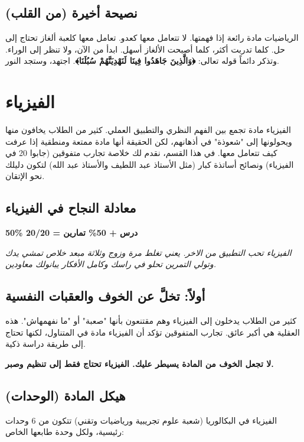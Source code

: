 \documentclass[12pt,a4paper]{book}
\newcommand{\quoteAr}[1]{%
	\begin{myquote}
		\itshape #1
	\end{myquote}
}
\newcommand{\importantAr}[1]{%
	\begin{important}
		\bfseries #1
	\end{important}
}
\begin{document}
	\subsection{نصيحة أخيرة (من القلب)}
	الرياضيات مادة رائعة إذا فهمتها. لا تتعامل معها كعدو. تعامل معها كلعبة ألغاز تحتاج إلى حل. كلما تدربت أكثر، كلما أصبحت الألغاز أسهل. ابدأ من الآن، ولا تنظر إلى الوراء. وتذكر دائماً قوله تعالى: \textbf{﴿وَالَّذِينَ جَاهَدُوا فِينَا لَنَهْدِيَنَّهُمْ سُبُلَنَا﴾}. اجتهد، وستجد النور.
	
	
	\section{الفيزياء}
	
	الفيزياء مادة تجمع بين الفهم النظري والتطبيق العملي. كثير من الطلاب يخافون منها ويحولونها إلى "شعوذة" في أذهانهم، لكن الحقيقة أنها مادة ممتعة ومنطقية إذا عرفت كيف تتعامل معها. في هذا القسم، نقدم لك خلاصة تجارب متفوقين (جابوا 20 في الفيزياء) ونصائح أساتذة كبار (مثل الأستاذ عبد اللطيف والأستاذ عبد الله) لتكون دليلك نحو الإتقان.
	
	\subsection{معادلة النجاح في الفيزياء}
	\begin{center}
		\Large
		\textbf{50\% درس + 50\% تمارين = 20/20}
	\end{center}
	
	\quoteAr{الفيزياء تحب التطبيق من الاخر. يعني تغلط مرة وزوج وثلاثة مبعد خلاص تمشي يدك وتولي التمرين تحلو في راسك وكامل الأفكار يبانولك معاودين.}
	
	\subsection{أولاً: تخلَّ عن الخوف والعقبات النفسية}
	كثير من الطلاب يدخلون إلى الفيزياء وهم مقتنعون بأنها "صعبة" أو "ما نفهمهاش". هذه العقلية هي أكبر عائق. تجارب المتفوقين تؤكد أن الفيزياء مادة في المتناول، لكنها تحتاج إلى طريقة دراسة ذكية.
	
	\importantAr{لا تجعل الخوف من المادة يسيطر عليك. الفيزياء تحتاج فقط إلى تنظيم وصبر.}
	
	\subsection{هيكل المادة (الوحدات)}
	الفيزياء في البكالوريا (شعبة علوم تجريبية ورياضيات وتقني) تتكون من 6 وحدات رئيسية، ولكل وحدة طابعها الخاص:
	
\end{document}
